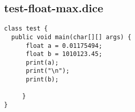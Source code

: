 \subsection{test-float-max.dice}
\begin{verbatim}
class test {
  public void main(char[][] args) {
      float a = 0.01175494;
      float b = 1010123.45;
      print(a);
      print("\n");
      print(b);

     }
}
\end{verbatim}